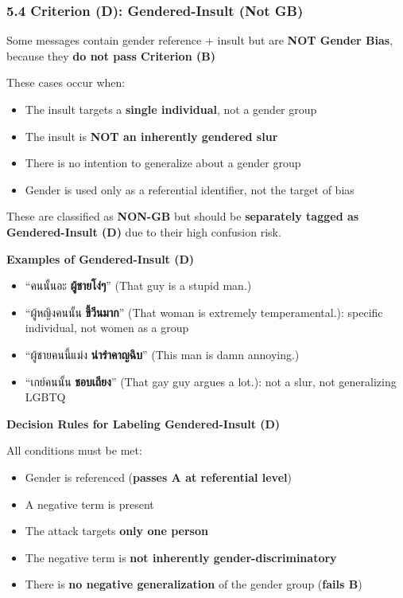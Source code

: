 \documentclass[12pt,oneside,openright,a4paper]{cpe-english-project}
\begin{document}
\subsubsection{5.4 Criterion (D): Gendered-Insult (Not GB)}\label{criterion-d-gendered-insult-not-gb}

Some messages contain gender reference + insult but are \textbf{NOT
Gender Bias}, because they \textbf{do not pass Criterion (B)}

These cases occur when:

\begin{itemize}
\setlength{\itemsep}{0.15\baselineskip}
\setlength{\parsep}{0pt}
\setlength{\parskip}{0pt}
\item
  The insult targets a \textbf{single individual}, not a gender group
\item
  The insult is \textbf{NOT an inherently gendered slur}
\item
  There is no intention to generalize about a gender group
\item
  Gender is used only as a referential identifier, not the target of
  bias
\end{itemize}

These are classified as \textbf{NON-GB} but should be \textbf{separately
tagged as Gendered-Insult (D)} due to their high confusion risk.

\textbf{Examples of Gendered-Insult (D)}

\begin{itemize}
\setlength{\itemsep}{0.15\baselineskip}
\setlength{\parsep}{0pt}
\setlength{\parskip}{0pt}
\item
  ``คนนั้นอะ \textbf{ผู้ชายโง่ๆ}''
  (That guy is a stupid man.)
\item
  ``ผู้หญิงคนนั้น \textbf{ขี้วีนมาก}''
  (That woman is extremely temperamental.): specific individual, not
  women as a group
\item
  ``ผู้ชายคนนี้แม่ง \textbf{น่ารำคาญฉิบ}''
  (This man is damn annoying.)
\item
  ``เกย์คนนั้น \textbf{ชอบเถียง}''
  (That gay guy argues a lot.): not a slur, not generalizing LGBTQ
\end{itemize}

\textbf{Decision Rules for Labeling Gendered-Insult (D)}

All conditions must be met:

\begin{itemize}
\setlength{\itemsep}{0.15\baselineskip}
\setlength{\parsep}{0pt}
\setlength{\parskip}{0pt}
\item
  Gender is referenced (\textbf{passes A at referential level})
\item
  A negative term is present
\item
  The attack targets \textbf{only one person}
\item
  The negative term is \textbf{not inherently gender-discriminatory}
\item
  There is \textbf{no negative generalization} of the gender group
  (\textbf{fails B})
\end{itemize}
\end{document}

